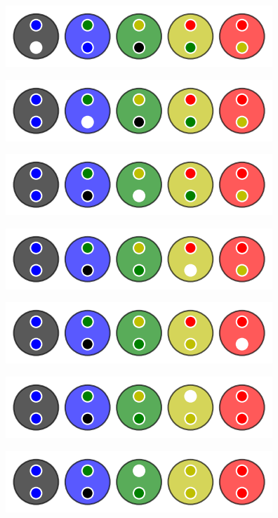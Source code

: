 \begin{multicols}{2}
\begin{center}
		\includegraphics[scale= 0.45]{content/algo_bubble/example/007.png}
	\end{center}
	
	\columnbreak
	
	\begin{center}
		\includegraphics[scale= 0.45]{content/algo_bubble/example/008.png}

		\includegraphics[scale= 0.45]{content/algo_bubble/example/009.png}

		\includegraphics[scale= 0.45]{content/algo_bubble/example/010.png}

		\includegraphics[scale= 0.45]{content/algo_bubble/example/011.png}

		\includegraphics[scale= 0.45]{content/algo_bubble/example/012.png}

		\includegraphics[scale= 0.45]{content/algo_bubble/example/013.png}


\end{center}
\end{multicols}
